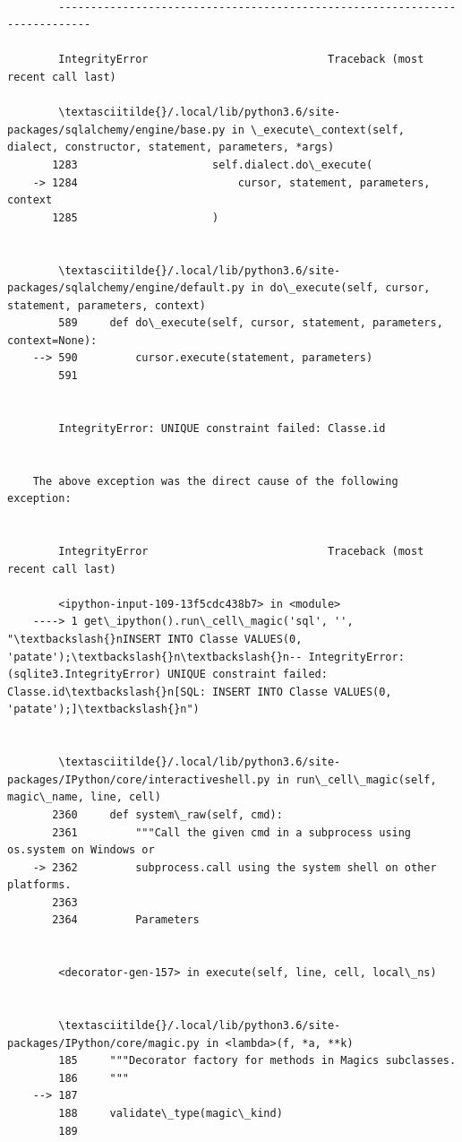 \documentclass[11pt]{article}
\begin{document}
    \begin{Verbatim}[commandchars=\\\{\}]

        ---------------------------------------------------------------------------

        IntegrityError                            Traceback (most recent call last)

        \textasciitilde{}/.local/lib/python3.6/site-packages/sqlalchemy/engine/base.py in \_execute\_context(self, dialect, constructor, statement, parameters, *args)
       1283                     self.dialect.do\_execute(
    -> 1284                         cursor, statement, parameters, context
       1285                     )


        \textasciitilde{}/.local/lib/python3.6/site-packages/sqlalchemy/engine/default.py in do\_execute(self, cursor, statement, parameters, context)
        589     def do\_execute(self, cursor, statement, parameters, context=None):
    --> 590         cursor.execute(statement, parameters)
        591 


        IntegrityError: UNIQUE constraint failed: Classe.id

        
    The above exception was the direct cause of the following exception:


        IntegrityError                            Traceback (most recent call last)

        <ipython-input-109-13f5cdc438b7> in <module>
    ----> 1 get\_ipython().run\_cell\_magic('sql', '', "\textbackslash{}nINSERT INTO Classe VALUES(0, 'patate');\textbackslash{}n\textbackslash{}n-- IntegrityError: (sqlite3.IntegrityError) UNIQUE constraint failed: Classe.id\textbackslash{}n[SQL: INSERT INTO Classe VALUES(0, 'patate');]\textbackslash{}n")
    

        \textasciitilde{}/.local/lib/python3.6/site-packages/IPython/core/interactiveshell.py in run\_cell\_magic(self, magic\_name, line, cell)
       2360     def system\_raw(self, cmd):
       2361         """Call the given cmd in a subprocess using os.system on Windows or
    -> 2362         subprocess.call using the system shell on other platforms.
       2363 
       2364         Parameters


        <decorator-gen-157> in execute(self, line, cell, local\_ns)


        \textasciitilde{}/.local/lib/python3.6/site-packages/IPython/core/magic.py in <lambda>(f, *a, **k)
        185     """Decorator factory for methods in Magics subclasses.
        186     """
    --> 187 
        188     validate\_type(magic\_kind)
        189 



\end{Verbatim}
\end{document}
